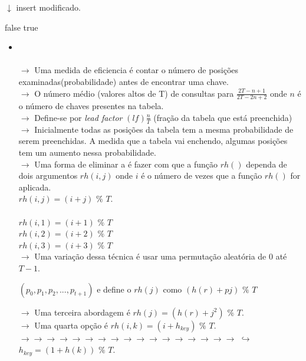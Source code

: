 \documentclass[a4paper, 12pt]{article}
\begin{document}
\begin{itemize}
$\downarrow$ insert modificado.
\begin{algorithmic}[1]
		\EndIf
	\EndWhile
{}
	\State \Return false
\Else
	\Else
		\State \Return true
	\EndIf	
\EndIf
\end{algorithmic}

\begin{itemize}
\item  {}\\
\\
$\rightarrow$ Uma medida de eficiencia é contar o número de posições examinadas(probabilidade) antes de encontrar uma chave.\\
$\rightarrow$ O número médio (valores altos de T) de consultas para $\frac{2T - n+1}{2T - 2n+2}$ onde $n$ é o número de chaves presentes na tabela.\\
$\rightarrow$ Define-se por \textit{lead factor} $(lf)\frac{n}{T}$ (fração da tabela que está preenchida)\\
$\rightarrow$ Inicialmente todas as posições da tabela tem a mesma probabilidade de serem preenchidas. A medida que a tabela vai enchendo, algumas posições tem um aumento nessa probabilidade.\\
$\rightarrow$ Uma forma de eliminar a  é fazer com que a função $rh()$ dependa de dois argumentos $rh(i,j)$ onde $i$ é o número de vezes que a função $rh()$ for aplicada.\\ $rh(i, j) = (i+j)$ $\%$ $T$.\\
\\
$rh(i, 1) = (i+1)$ $\%$ $T$\\
$rh(i, 2) = (i+2)$ $\%$ $T$\\
$rh(i, 3) = (i+3)$ $\%$ $T$\\

$\rightarrow$ Uma variação dessa técnica é usar uma permutação aleatória de $0$ até $T-1$.\\
\begin{center}
$(p_{0}, p_{1}, p_{2}, ... ,p_{t+1})$ e define o $rh(j)$ como $(h(r) + pj)$ $\%$ $T$
\end{center}
$\rightarrow$ Uma terceira abordagem é $rh(j) = (h(r) + j^2)$ $\%$ $T$.\\
$\rightarrow$ Uma quarta opção é $rh(i, k) = (i + h_{key})$ $\%$ $T$.\\
\color{white}
$\rightarrow \rightarrow \rightarrow \rightarrow \rightarrow \rightarrow \rightarrow \rightarrow \rightarrow \rightarrow \rightarrow \rightarrow \rightarrow \rightarrow \rightarrow \rightarrow \rightarrow$
\color{black}
$\hookrightarrow$ $h_{key} = (1 + h(k))$ $\%$ $T$.\\ 


\end{itemize}
\end{itemize}
\end{document}
